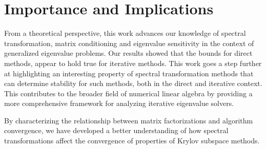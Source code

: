 \section{Importance and Implications}
From a theoretical perspective, this work advances our knowledge of spectral transformation, matrix conditioning and eigenvalue sensitivity in the context of generalized eigenvalue problems. Our results showed that the bounds for direct methods, appear to hold true for iterative methods. This work goes a step further at highlighting an interesting property of spectral transformation methods that can determine stability for such methods, both in the direct and iterative context. This contributes to the broader field of numerical linear algebra by providing a more comprehensive framework for analyzing iterative eigenvalue solvers.

By characterizing the relationship between matrix factorizations and algorithm convergence, we have developed a better understanding of how spectral transformations affect the convergence of properties of Krylov subspace methods.



